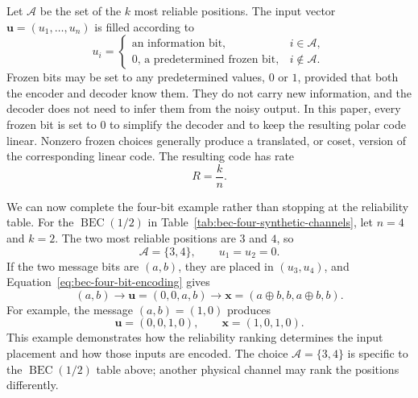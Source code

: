 Let $\mathcal{A}$ be the set of the $k$ most reliable positions. The input vector $\mathbf{u}=(u_1,\ldots,u_n)$ is filled according to
\begin{equation}
u_i=
\begin{cases}
\text{an information bit}, & i\in\mathcal{A},\\
0\text{, a predetermined frozen bit}, & i\notin\mathcal{A}.
\end{cases}
\label{eq:polar-information-and-frozen-positions}
\end{equation}
Frozen bits may be set to any predetermined values, $0$ or $1$, provided that both the encoder and decoder know them. They do not carry new information, and the decoder does not need to infer them from the noisy output. In this paper, every frozen bit is set to $0$ to simplify the decoder and to keep the resulting polar code linear. Nonzero frozen choices generally produce a translated, or coset, version of the corresponding linear code. The resulting code has rate
\begin{equation}
R=\frac{k}{n}.
\label{eq:polar-code-rate}
\end{equation}

We can now complete the four-bit example rather than stopping at the reliability table. For the $\operatorname{BEC}(1/2)$ in Table~\ref{tab:bec-four-synthetic-channels}, let $n=4$ and $k=2$. The two most reliable positions are $3$ and $4$, so
\begin{equation}
\mathcal{A}=\{3,4\},
\qquad
u_1=u_2=0.
\label{eq:bec-four-information-set}
\end{equation}
If the two message bits are $(a,b)$, they are placed in $(u_3,u_4)$, and Equation~\eqref{eq:bec-four-bit-encoding} gives
\begin{equation}
(a,b)
\longrightarrow
\mathbf{u}=(0,0,a,b)
\longrightarrow
\mathbf{x}=(a\oplus b,b,a\oplus b,b).
\label{eq:bec-four-polar-encoding-example}
\end{equation}
For example, the message $(a,b)=(1,0)$ produces
\begin{equation}
\mathbf{u}=(0,0,1,0),
\qquad
\mathbf{x}=(1,0,1,0).
\label{eq:bec-four-concrete-codeword}
\end{equation}
This example demonstrates how the reliability ranking determines the input placement and how those inputs are encoded. The choice $\mathcal{A}=\{3,4\}$ is specific to the $\operatorname{BEC}(1/2)$ table above; another physical channel may rank the positions differently.

